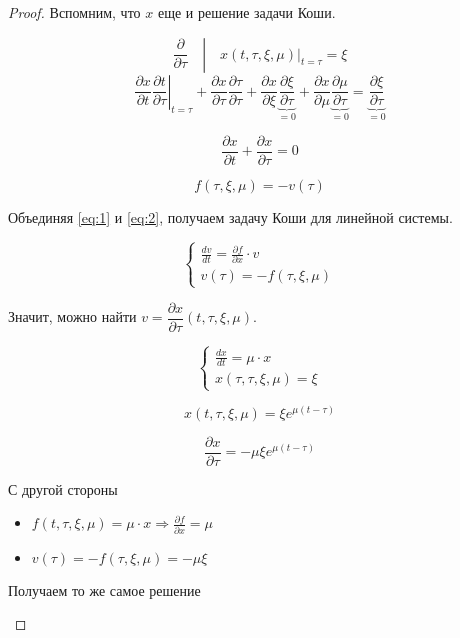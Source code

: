 \begin{proof}
  Вспомним, что $x$ еще и решение задачи Коши.

  $$ \left. \frac{\partial}{\partial \tau}\quad \right| \quad
  \left.x(t, \tau, \xi, \mu) \right|_{t = \tau} = \xi$$
  $$\left.\frac{\partial x}{\partial t} \frac{\partial t}{\partial \tau} \right|_{t = \tau} +
  \frac{\partial x}{\partial \tau} \frac{\partial \tau}{\partial \tau} +
  \frac{\partial x}{\partial \xi} \underbrace{\frac{\partial \xi}{\partial \tau}}_{=0} +
  \frac{\partial x}{\partial \mu} \underbrace{\frac{\partial \mu}{\partial \tau}}_{= 0} =
  \underbrace{\frac{\partial \xi}{\partial \tau}}_{=0}$$

  $$\frac{\partial x}{\partial t} + \frac{\partial x}{\partial \tau} = 0$$
  
  \begin{equation}
    \label{eq:2}
    f(\tau, \xi, \mu) = -v(\tau)
  \end{equation}

  Объединяя \ref*{eq:1} и \ref*{eq:2}, получаем задачу Коши для линейной системы.

  $$
    \begin{cases}
      \frac{dv}{dt} = \frac{\partial f}{\partial x} \cdot v \\
      v(\tau) = -f(\tau, \xi, \mu)
    \end{cases}
  $$

  Значит, можно найти $v = \dfrac{\partial x}{\partial \tau}(t, \tau, \xi, \mu)$.

  \begin{example}
    $$
    \begin{cases}
      \frac{dx}{dt} = \mu \cdot x \\
      x(\tau, \tau, \xi, \mu) = \xi
    \end{cases}
    $$
  
    $$x(t, \tau, \xi, \mu) = \xi e^{\mu(t - \tau)}$$
  
    $$\frac{\partial x}{\partial \tau} = -\mu \xi e^{\mu(t - \tau)}$$
  
    С другой стороны
    \begin{itemize}
      \item $f(t, \tau, \xi, \mu) = \mu \cdot x \Rightarrow \frac{\partial f}{\partial x} = \mu$
      \item $v(\tau) = -f(\tau, \xi, \mu) = -\mu \xi$
    \end{itemize}
  
    Получаем то же самое решение
  \end{example}


\end{proof}
